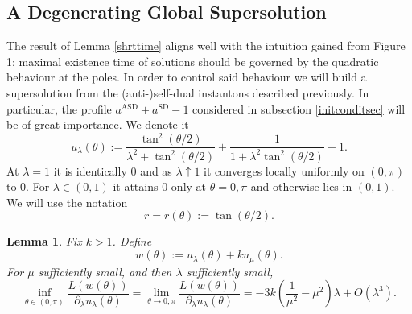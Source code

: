 \documentclass[11pt,a4paper]{article}
\numberwithin{equation}{section}
\theoremstyle{plain}
\newtheorem{lemma}[theorem]{Lemma}
\theoremstyle{remark}
\begin{document}
\subsection{A Degenerating Global Supersolution}

The result of Lemma \ref{shrttime} aligns well with the intuition gained from Figure 1: maximal existence time of solutions should be governed by the quadratic behaviour at the poles. In order to control said behaviour we will build a supersolution from the (anti-)self-dual instantons described previously. In particular, the profile $a^{\mathrm{ASD}} + a^{\mathrm{SD}} - 1$ considered in subsection \ref{initconditsec} will be of great importance. We denote it
$$
u_\lambda(\theta)
:=
\frac{\tan^2(\theta/2)}{\lambda^2+\tan^2(\theta/2)}
+
\frac{1}{1+\lambda^2\tan^2(\theta/2)} - 1.
$$
At $\lambda=1$ it is identically $0$ and as $\lambda\uparrow1$ it converges locally uniformly on $(0,\pi)$ to $0$. For $\lambda\in(0,1)$ it attains $0$ only at $\theta=0,\pi$ and otherwise lies in $(0,1)$. We will use the notation
$$
r=r(\theta):=\tan(\theta/2).
$$
\begin{lemma}\label{Fcomp}
Fix $k>1$. Define
$$
w(\theta):=u_\lambda(\theta)+k u_\mu(\theta).
$$
For $\mu$ sufficiently small, and then $\lambda$ sufficiently small,
$$
\inf_{\theta\in(0,\pi)}\frac{L(w(\theta))}{\partial_\lambda u_\lambda(\theta)}=\lim_{\theta\to 0,\pi}\frac{L(w(\theta))}{\partial_\lambda u_\lambda(\theta)}
=
-3k\left(\frac{1}{\mu^2}-\mu^2\right)\lambda + O(\lambda^3).
$$
\end{lemma}
\end{document}
